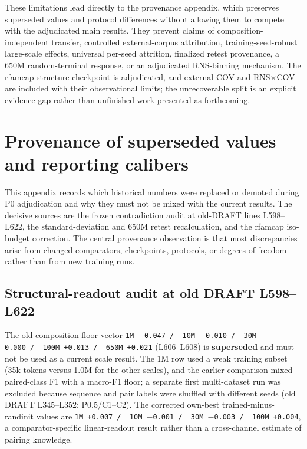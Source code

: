 These limitations lead directly to the provenance appendix, which preserves superseded values and protocol differences without allowing them to compete with the adjudicated main results. They prevent claims of composition-independent transfer, controlled external-corpus attribution, training-seed-robust large-scale effects, universal per-seed attrition, finalized retest provenance, a 650M random-terminal response, or an adjudicated RNS-binning mechanism. The rfamcap structure checkpoint is adjudicated, and external COV and RNS\(\times\)COV are included with their observational limits; the unrecoverable split is an explicit evidence gap rather than unfinished work presented as forthcoming.

\appendix
\hypertarget{appendix-a.-provenance-of-superseded-values-and-reporting-calibers}{%
\section{Provenance of superseded values and reporting calibers}\label{appendix-a.-provenance-of-superseded-values-and-reporting-calibers}}

This appendix records which historical numbers were replaced or demoted during P0 adjudication and why they must not be mixed with the current results. The decisive sources are the frozen contradiction audit at old-DRAFT lines L598--L622, the standard-deviation and 650M retest recalculation, and the rfamcap iso-budget correction. The central provenance observation is that most discrepancies arise from changed comparators, checkpoints, protocols, or degrees of freedom rather than from new training runs.

\hypertarget{a.1-structural-readout-audit-at-old-draft-l598l622}{%
\subsection{Structural-readout audit at old DRAFT L598--L622}\label{a.1-structural-readout-audit-at-old-draft-l598l622}}

The old composition-floor vector \texttt{1M\ \(-\)0.047\ /\allowbreak\ \ 10M\ \(-\)0.010\ /\allowbreak\ \ 30M\ \(-\)0.000\ /\allowbreak\ \ 100M\ +0.013\ /\allowbreak\ \ 650M\ +0.021} (L606--L608) is \textbf{superseded} and must not be used as a current scale result. The 1M row used a weak training subset (35k tokens versus 1.0M for the other scales), and the earlier comparison mixed paired-class F1 with a macro-F1 floor; a separate first multi-dataset run was excluded because sequence and pair labels were shuffled with different seeds (old DRAFT L345--L352; P0.5/C1--C2). The corrected own-best trained-minus-randinit values are \texttt{1M\ +0.007\ /\allowbreak\ \ 10M\ \(-\)0.001\ /\allowbreak\ \ 30M\ \(-\)0.003\ /\allowbreak\ \ 100M\ +0.004}, a comparator-specific linear-readout result rather than a cross-channel estimate of pairing knowledge.

